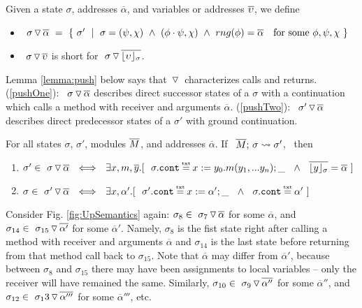 \begin{definition}
\label{def:push:frame}
Given a state $\sigma$, addresses $\overline \alpha$, and variables or addresses $\overline \va$, we define
\begin{itemize}
\item
$ \PushS  {\alpha} {\sigma} \ =\ \{ \ \sigma' \ \mid\ \sigma=(\psi, \chi)\  \wedge\  (\phi\cdot \psi, \chi) \ \wedge\ rng(\phi)=\overline \alpha \ \ \mbox{ for some } \phi, \psi, \chi \ \}$
\item
{$ \PushS  {\va}  {\sigma}$ is short for  $ \PushS  {\interpret {\sigma} {\va}} {\sigma} $.}
\end{itemize}
\end{definition}

 {Lemma \ref{lemma:push} below says that  $\pushSymbol$ characterizes  calls and returns.  (\ref{pushOne}):\ $ \PushS   {\alpha} {\sigma}$ describes    direct successor states of  a $\sigma$ with a continuation which calls a method with receiver and arguments $\overline \alpha$. 
 (\ref{pushTwo}):\ $ \PushS   {\alpha} {\sigma'}$  describes direct predecessor states of  a $\sigma'$ with ground continuation.}
  
\begin{lemma}%
\label{lemma:push}
For all states $\sigma$, $\sigma'$, modules $\Mtwo$, and addresses $\overline \alpha$. If \ $\leadstoOrig {\Mtwo} {\sigma}   {\sigma'} $, \ then 
\begin{enumerate}
\item
\label{pushOne}
$\sigma'\in   \PushS  {\alpha} {\sigma}  \ \ \Longleftrightarrow \ \ 
\exists x, m, \overline{y}.[\ \ \sigma.\prg{cont} \txteq x:=y_0.m(y_1,...y_n); \_\ \ \wedge \ \
{\overline { \interpret  \sigma y}} = \overline \alpha \ ] $
\item
\label{pushTwo}
$\sigma\in   \PushS  {\alpha} {\sigma'}  \ \ \Longleftrightarrow \ \ \exists x, \alpha'.[\ \  \sigma'.\prg{cont}\txteq x:=\alpha';\_ \ \ \wedge \ \  \sigma.\prg{cont}\txteq\alpha'\  ] $
\end{enumerate}

\end{lemma}

 

 {Consider Fig. \ref{fig:UpSemantics} again: $\sigma_8\in   \PushS  {\alpha} {\sigma_7}$ for some $\overline \alpha$, and 
 $\sigma_{14}\in\PushS  {\alpha'} {\sigma_{15}}$ for some $\overline \alpha'$. Namely, $\sigma_8$ is the fist state right after calling a method with receiver and
 arguments $\overline \alpha$ and $\sigma_{14}$ is the last state before returning from that method call back to $\sigma_{15}$.
Note that $\overline \alpha$ may differ from $\overline \alpha'$, because between $\sigma_8$ and $\sigma_{15}$ there may 
have been assignments to local variables -- only the receiver will have remained the same.
Similarly, 
 $\sigma_{10}\in\PushS  {\alpha''} {\sigma_9}$ for some $\overline \alpha''$, and  $\sigma_{12}\in\PushS  {\alpha'''} {\sigma_13}$ for some $\overline \alpha'''$, etc.
}


